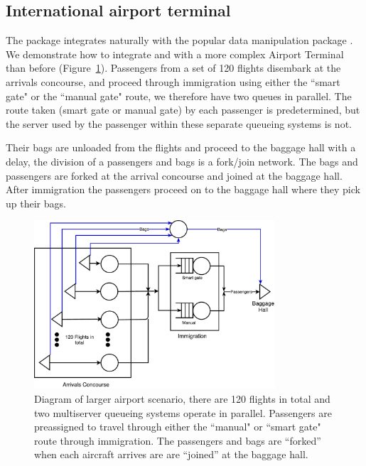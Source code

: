 \documentclass[article]{jss}
\begin{document}
\subsection{International airport terminal} \label{ssec:largerairport}

The package integrates naturally with the popular data manipulation  package  \citep{Rpkg_dplyr}. We demonstrate how to integrate  and  with a more complex Airport Terminal than before (Figure~\ref{fig:larger_airport}). Passengers from a set of 120 flights disembark at the arrivals concourse, and proceed through immigration using either the ``smart gate" or the ``manual gate" route, we therefore have two queues in parallel. The route taken (smart gate or manual gate) by each passenger is predetermined, but the server used by the passenger within these separate queueing systems is not. 

Their bags are unloaded from the flights and proceed to the baggage hall with a delay, the division of a passengers and bags is a fork/join network. The bags and passengers are forked at the arrival concourse and joined at the baggage hall. After immigration the passengers proceed on to the baggage hall where they pick up their bags. 

\begin{figure}[!htb]
\centering
\includegraphics[width = 0.8\textwidth]{figures/Larger_airport.pdf}
\caption{Diagram of larger airport scenario, there are 120 flights in total and two multiserver queueing systems operate in parallel. Passengers are preassigned to travel through either the ``manual" or ``smart gate" route through immigration. The passengers and bags are ``forked'' when each aircraft arrives are are ``joined'' at the baggage hall. }
\label{fig:larger_airport}
\end{figure}
\end{document}
